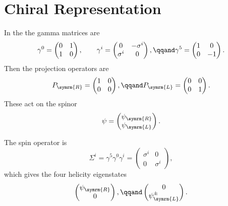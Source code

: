 \documentclass[fleqn]{NotesClass}
\newcommand{\Left}{\symrm{L}}
\newcommand{\Right}{\symrm{R}}
\begin{document}
    \section{Chiral Representation}
    In the  the gamma matrices are
    \begin{equation}
        \gamma^0 = 
        \begin{pmatrix}
            0 & 1\\
            1 & 0
        \end{pmatrix}
        , \qquad \gamma^i = 
        \begin{pmatrix}
            0 & -\sigma^i\\
            \sigma^i & 0
        \end{pmatrix}
        , \qqand \gamma^5 = 
        \begin{pmatrix}
            1 & 0\\
            0 & -1
        \end{pmatrix}
        .
    \end{equation}
    Then the projection operators are
    \begin{equation}
        P_{\Right} = 
        \begin{pmatrix}
            1 & 0\\
            0 & 0
        \end{pmatrix}
        , \qqand P_{\Left} = 
        \begin{pmatrix}
            0 & 0\\
            0 & 1
        \end{pmatrix}
        .
    \end{equation}
    These act on the spinor
    \begin{equation}
        \psi = 
        \begin{pmatrix}
            \psi_{\Right}\\ \psi_{\Left}
        \end{pmatrix}
        .
    \end{equation}
    
    The spin operator is
    \begin{equation}
        \Sigma^i = \gamma^5\gamma^0\gamma^i = 
        \begin{pmatrix}
            \sigma^i & 0\\
            0 & \sigma^i
        \end{pmatrix}
        ,
    \end{equation}
    which gives the four helicity eigenstates
    \begin{equation}
        \begin{pmatrix}
            \psi_{\Right}\\ 0
        \end{pmatrix}
        , \qqand 
        \begin{pmatrix}
            0\\ \psi^{\pm}_{\Left}
        \end{pmatrix}
        .
    \end{equation}
    
\end{document}

